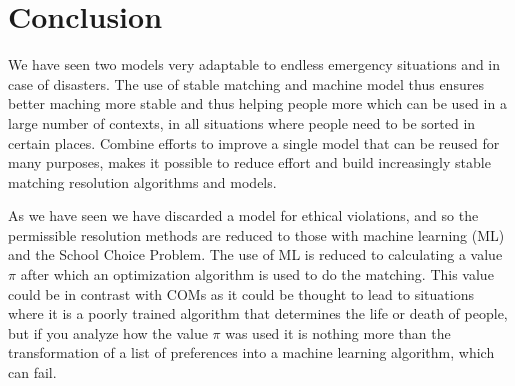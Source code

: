 \section{Conclusion}
We have seen two models very adaptable to endless emergency situations and in case of disasters.
The use of stable matching and machine model thus ensures better maching more stable and thus helping people more which can be used in a large number of contexts, in all situations where people need to be sorted in certain places.
Combine efforts to improve a single model that can be reused for many purposes, makes it possible to reduce effort and build increasingly stable matching resolution algorithms and models.

As we have seen we have discarded a model for ethical violations, and so the permissible resolution methods are reduced to those with machine learning (ML) and the School Choice Problem.
The use of ML is reduced to calculating a value \(\pi\) after which an optimization algorithm is used to do the matching.
This value could be in contrast with COMs as it could be thought to lead to situations where it is a poorly trained algorithm that determines the life or death of people, but if you analyze how the value \(\pi\) was used it is nothing more than the transformation of a list of preferences into a machine learning algorithm, which can fail.
